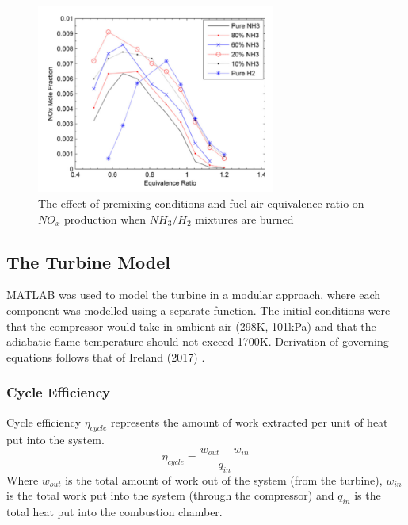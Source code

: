 \documentclass[11pt, oneside]{article}
\begin{document}
\begin{figure} [h]
\centering
\includegraphics[width=0.7\textwidth]{./pictures/NOxemissions.png}
  \caption{The effect of premixing conditions and fuel-air equivalence ratio on $NO_x$ production when $NH_3/H_2$ mixtures are burned \cite{Nozari2015}} \label{fig:NOxemissions}
  \end{figure}
\subsection{The Turbine Model}
MATLAB was used to model the turbine in a modular approach, where each component was modelled using a separate function. The initial conditions were that the compressor would take in ambient air (298K, 101kPa) and that the adiabatic flame temperature should not exceed 1700K. Derivation of governing equations follows that of Ireland (2017) \cite{thermonotes}.

\subsubsection{Cycle Efficiency}
Cycle efficiency $\eta_{cycle}$ represents the amount of work extracted per unit of heat put into the system.
\begin{equation}
\eta_{cycle} = \frac{w_{out} - w_{in}}{q_{in}}
\end{equation}
Where $w_{out}$ is the total amount of work out of the system (from the turbine), $w_{in}$ is the total work put into the system (through the compressor) and $q_{in}$ is the total heat put into the combustion chamber.
\end{document}
